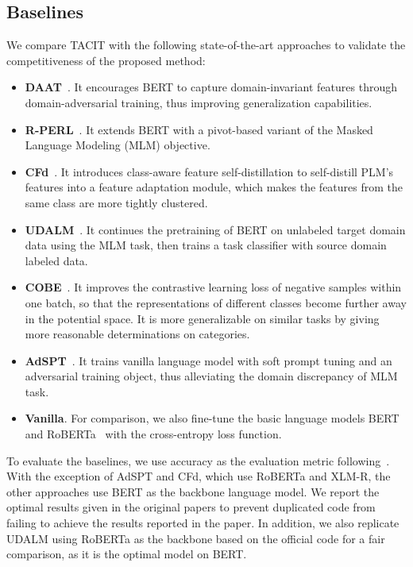 \documentclass[letterpaper]{article} %
\begin{document}
\subsection{Baselines}\label{sec:baseline}
We compare TACIT with the following state-of-the-art approaches to validate the competitiveness of the proposed method:
\begin{itemize}
	\item \textbf{DAAT}~\cite{DuSWQL20}. It encourages BERT to capture domain-invariant features through domain-adversarial training, thus improving generalization capabilities. 
	\item \textbf{R-PERL}~\cite{Ben-DavidRR20}. It extends BERT with a pivot-based variant of the Masked Language Modeling (MLM) objective. 
	\item \textbf{CFd}~\cite{YeTHLNB20}. It introduces class-aware feature self-distillation to self-distill PLM's features into a	feature adaptation module, which makes the features from the same class are more tightly clustered. 
	\item \textbf{UDALM}~\cite{KarouzosPP21}. It continues the pretraining of BERT on unlabeled target domain data using the MLM task, then trains a task classifier with source domain labeled data. 
	\item \textbf{COBE}~\cite{LuoGL022}. It improves the contrastive learning loss of negative samples within one batch, so that the representations of different classes become further away in the potential space. It is more generalizable on similar tasks by giving more reasonable determinations on categories. 
	\item \textbf{AdSPT}~\cite{WuS22}. It trains vanilla language model with soft prompt tuning and an adversarial training object, thus alleviating the domain discrepancy
	of MLM task.
	\item \textbf{Vanilla}. For comparison, we also fine-tune the basic language models BERT~\cite{DevlinCLT19} and RoBERTa~\cite{RoBERTa} with the cross-entropy loss function. 
\end{itemize}
To evaluate the baselines, we use accuracy as the evaluation metric following~\cite{KarouzosPP21, WuS22}. With the exception of AdSPT and CFd, which use RoBERTa and XLM-R, the other approaches use BERT as the backbone language model. We report the optimal results given in the original papers to prevent duplicated code from failing to achieve the results reported in the paper. In addition, we also replicate UDALM using RoBERTa as the backbone based on the official code for a fair comparison, as it is the optimal model on BERT. 
\end{document}
